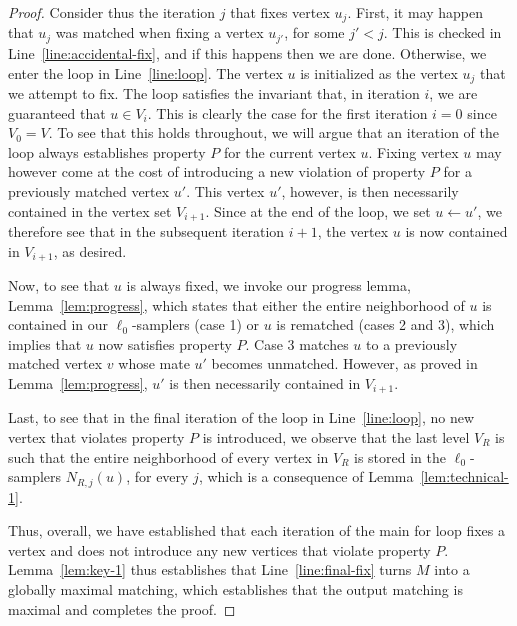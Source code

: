 \documentclass[11pt,a4paper]{article}
\begin{document}
\begin{proof}
    Consider thus the iteration $j$ that fixes vertex $u_j$. First, it may happen that $u_j$ was matched when fixing a vertex $u_{j'}$, for some $j' < j$. This is checked in Line~\ref{line:accidental-fix}, and if this happens then we are done. Otherwise, we enter the loop in Line~\ref{line:loop}. The vertex $u$ is initialized as the vertex $u_j$ that we attempt to fix. The loop satisfies the invariant that, in iteration $i$, we are guaranteed that $u \in V_i$. This is clearly the case for the first iteration $i=0$ since $V_0 = V$. To see that this holds throughout, we will argue that an iteration of the loop always establishes property $P$ for the current vertex $u$. Fixing vertex $u$ may however come at the cost of introducing a new violation of property $P$ for a previously matched vertex $u'$. This vertex $u'$, however, is then necessarily  contained in the vertex set $V_{i+1}$. Since at the end of the loop, we set $u \gets u'$, we therefore see that in the subsequent iteration $i+1$, the vertex $u$ is now contained in $V_{i+1}$, as desired. 

    Now, to see that $u$ is always fixed, we invoke our progress lemma, Lemma~\ref{lem:progress}, which states that either the entire neighborhood of $u$ is contained in our $\ell_0$-samplers (case 1) or $u$ is rematched (cases 2 and 3), which implies that $u$ now satisfies property $P$. Case 3 matches $u$ to a previously matched vertex $v$ whose mate $u'$ becomes unmatched. However, as proved in Lemma~\ref{lem:progress}, $u'$ is then necessarily contained in $V_{i+1}$. 

    Last, to see that in the final iteration of the loop in Line~\ref{line:loop}, no new vertex that violates property $P$ is introduced, we observe that the last level $V_R$ is such that the entire neighborhood of every vertex in $V_R$ is stored in the $\ell_0$-samplers $N_{R,j}(u)$, for every $j$, which is a consequence of Lemma~\ref{lem:technical-1}.

    Thus, overall, we have established that each iteration of the main for loop fixes a vertex and does not introduce any new vertices that violate property $P$. Lemma~\ref{lem:key-1} thus establishes that Line~\ref{line:final-fix} turns $M$ into a globally maximal matching, which establishes that the output matching is maximal and completes the proof.

    
    




\end{proof}
\end{document}
